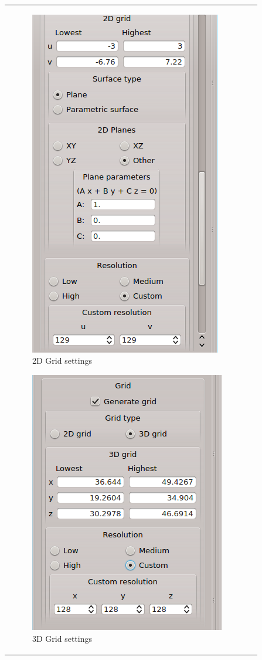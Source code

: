 \documentclass[10pt]{article}
\begin{document}
\begin{tabular}{lr}
\begin{minipage}{.4\linewidth}
\vspace*{-5mm}
\begin{figure}[H]
\vspace*{-5mm}
\begin{center}
\includegraphics[width=.5\linewidth]{damqt_fig_2_3_3.png}
\end{center}
\caption{2D Grid settings\label{fig:2_3_3}}
\end{figure}

\begin{figure}[H]
\vspace*{-5mm}
\begin{center}
\includegraphics[width=.5\linewidth]{damqt_fig_2_2_7.png}
\end{center}
\caption{3D Grid settings\label{fig:19}}
\end{figure}
\end{minipage}
\end{tabular}
\vspace*{1mm}
\end{document}
